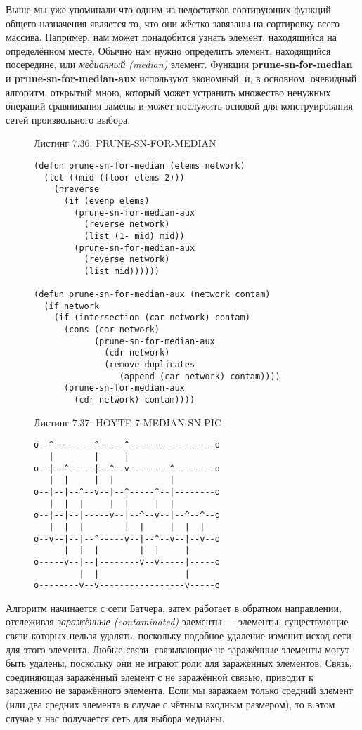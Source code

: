 Выше мы уже упоминали что одним из недостатков сортирующих функций общего-назначения является то, что они жёстко завязаны на сортировку всего массива. Например, нам может понадобится узнать элемент, находящийся на определённом месте. Обычно нам нужно определить элемент, находящийся посередине, или \emph{медианный (median)} элемент. Функции \textbf{prune-sn-for-median} и \textbf{prune-sn-for-median-aux} используют экономный, и, в основном, очевидный алгоритм, открытый мною, который может устранить множество ненужных операций срав\-ни\-ва\-ния-за\-ме\-ны и может послужить основой для конструирования сетей произвольного выбора.

\begin{figure}Листинг 7.36: PRUNE-SN-FOR-MEDIAN\label{listing_7.36}
\listbegin
\begin{verbatim}
(defun prune-sn-for-median (elems network)
  (let ((mid (floor elems 2)))
    (nreverse
      (if (evenp elems)
        (prune-sn-for-median-aux
          (reverse network)
          (list (1- mid) mid))
        (prune-sn-for-median-aux
          (reverse network)
          (list mid))))))

(defun prune-sn-for-median-aux (network contam)
  (if network
    (if (intersection (car network) contam)
      (cons (car network)
            (prune-sn-for-median-aux
              (cdr network)
              (remove-duplicates
                 (append (car network) contam))))
      (prune-sn-for-median-aux
        (cdr network) contam)))) 
\end{verbatim}
\listend
\end{figure}

\begin{figure}Листинг 7.37: HOYTE-7-MEDIAN-SN-PIC\label{listing_7.37}
\listbegin
\begin{verbatim}
o--^--------^-----^-----------------o
   |        |     |
o--|--^-----|--^--v--------^--------o
   |  |     |  |           |
o--|--|--^--v--|--^-----^--|--------o
   |  |  |     |  |     |  |
o--|--|--|-----v--|--^--v--|--^--^--o
   |  |  |        |  |     |  |  |
o--v--|--|--^-----v--|--^--v--|--v--o
      |  |  |        |  |     | 
o-----v--|--|--------v--v-----|-----o
         |  |                 |
o--------v--v-----------------v-----o
\end{verbatim}
\listend
\end{figure}

Алгоритм начинается с сети Батчера, затем работает в обратном направлении, отслеживая \emph{заражённые (contaminated)} элементы --- элементы, существующие связи которых нельзя удалять, поскольку подобное удаление изменит исход сети для этого элемента. Любые связи, связывающие не заражённые элементы могут быть удалены, поскольку они не играют роли для заражённых элементов. Связь, соединяющая заражённый элемент с не заражённой связью, приводит к заражению не заражённого элемента. Если мы заражаем только средний элемент (или два средних элемента в случае с чётным входным размером), то в этом случае у нас получается сеть для выбора медианы.

